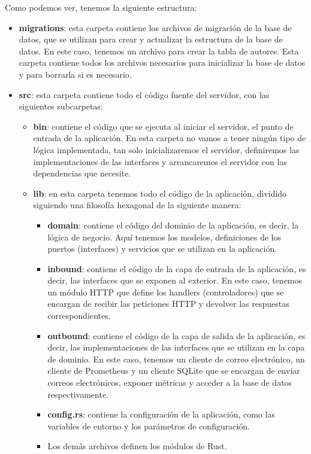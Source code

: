 Como podemos ver, tenemos la siguiente estructura:
\begin{itemize}
    \item \textbf{migrations}: esta carpeta contiene los archivos de migración de la base de datos, que se utilizan para crear y actualizar la estructura de la base de datos. En este caso, tenemos un archivo para crear la tabla de autores. Esta carpeta contiene todos los archivos necesarios para inicializar la base de datos y para borrarla si es necesario.
    \item \textbf{src}: esta carpeta contiene todo el código fuente del servidor, con las siguientes subcarpetas:
        \begin{itemize}
            \item \textbf{bin}: contiene el código que se ejecuta al iniciar el servidor, el punto de entrada de la aplicación. En esta carpeta no vamos a tener ningún tipo de lógica implementada, tan solo inicializaremos el servidor, definiremos las implementaciones de las interfaces y arrancaremos el servidor con las dependencias que necesite.
            \item \textbf{lib}: en esta carpeta tenemos todo el código de la aplicación, dividido siguiendo una filosofía hexagonal de la siguiente manera:
                \begin{itemize}
                    \item \textbf{domain}: contiene el código del dominio de la aplicación, es decir, la lógica de negocio. Aquí tenemos los modelos, definiciones de los puertos (interfaces) y servicios que se utilizan en la aplicación.
                    \item \textbf{inbound}: contiene el código de la capa de entrada de la aplicación, es decir, las interfaces que se exponen al exterior. En este caso, tenemos un módulo HTTP que define los handlers (controladores) que se encargan de recibir las peticiones HTTP y devolver las respuestas correspondientes.
                    \item \textbf{outbound}: contiene el código de la capa de salida de la aplicación, es decir, las implementaciones de las interfaces que se utilizan en la capa de dominio. En este caso, tenemos un cliente de correo electrónico, un cliente de Prometheus y un cliente SQLite que se encargan de enviar correos electrónicos, exponer métricas y acceder a la base de datos respectivamente.
                    \item \textbf{config.rs}: contiene la configuración de la aplicación, como las variables de entorno y los parámetros de configuración.
                    \item Los demás archivos definen los módulos de Rust.
                \end{itemize}
        \end{itemize}
\end{itemize}

